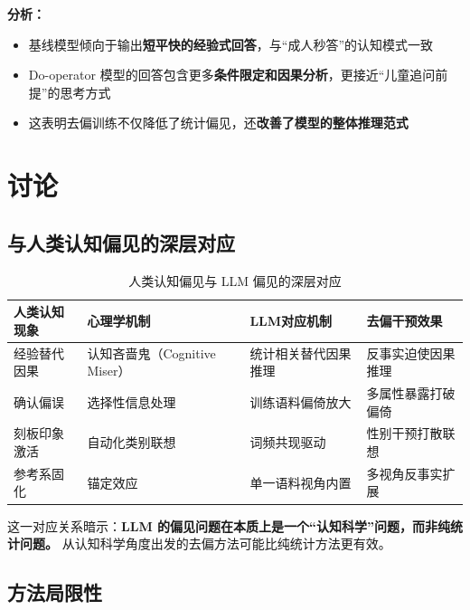 \documentclass[12pt,a4paper,oneside]{ctexart}
\begin{document}
\textbf{分析：}
\begin{itemize}
  \item 基线模型倾向于输出\textbf{短平快的经验式回答}，与``成人秒答''的认知模式一致
  \item Do-operator 模型的回答包含更多\textbf{条件限定和因果分析}，更接近``儿童追问前提''的思考方式
  \item 这表明去偏训练不仅降低了统计偏见，还\textbf{改善了模型的整体推理范式}
\end{itemize}

\section{讨论}

\subsection{与人类认知偏见的深层对应}

\begin{table}[H]
  \centering
  \caption{人类认知偏见与 LLM 偏见的深层对应}
  \label{tab:cognition_mapping}
  \begin{tabular}{p{}p{}p{}p{}}
    \toprule
    \textbf{人类认知现象} & \textbf{心理学机制} & \textbf{LLM对应机制} & \textbf{去偏干预效果} \\
    \midrule
    经验替代因果 & 认知吝啬鬼（Cognitive Miser） & 统计相关替代因果推理 & 反事实迫使因果推理 \\
    确认偏误 & 选择性信息处理 & 训练语料偏倚放大 & 多属性暴露打破偏倚 \\
    刻板印象激活 & 自动化类别联想 & 词频共现驱动 & 性别干预打散联想 \\
    参考系固化 & 锚定效应 & 单一语料视角内置 & 多视角反事实扩展 \\
    \bottomrule
  \end{tabular}
\end{table}

这一对应关系暗示：\textbf{LLM 的偏见问题在本质上是一个``认知科学''问题，而非纯统计问题。} 从认知科学角度出发的去偏方法可能比纯统计方法更有效。

\subsection{方法局限性}
\end{document}
